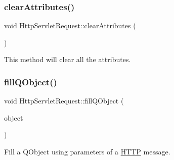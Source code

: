 \subsubsection{\texorpdfstring{clear\+Attributes()}{clearAttributes()}}
{\footnotesize\ttfamily void Http\+Servlet\+Request\+::clear\+Attributes (\begin{DoxyParamCaption}{ }\end{DoxyParamCaption})}



This method will clear all the attributes. 

\mbox{\label{class_http_servlet_request_a5bed980c9d5d04cecee50ac6fe011a90}} 
\subsubsection{\texorpdfstring{fill\+Q\+Object()}{fillQObject()}}
{\footnotesize\ttfamily void Http\+Servlet\+Request\+::fill\+Q\+Object (\begin{DoxyParamCaption}\item[{Q\+Object $\ast$}]{object }\end{DoxyParamCaption})}



Fill a Q\+Object using parameters of a \hyperlink{namespace_h_t_t_p}{H\+T\+TP} message. 


